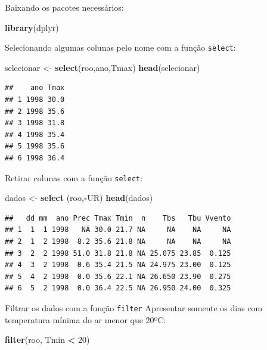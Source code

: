 \documentclass[
]{book}
\newenvironment{Shaded}{\begin{snugshade}}{\end{snugshade}}
\newcommand{\DecValTok}[1]{\textcolor[rgb]{0.00,0.00,0.81}{#1}}
\newcommand{\KeywordTok}[1]{\textcolor[rgb]{0.13,0.29,0.53}{\textbf{#1}}}
\newcommand{\NormalTok}[1]{#1}
\newcommand{\OperatorTok}[1]{\textcolor[rgb]{0.81,0.36,0.00}{\textbf{#1}}}
\newcommand{\StringTok}[1]{\textcolor[rgb]{0.31,0.60,0.02}{#1}}
\begin{document}
Baixando os pacotes necessários:

\begin{Shaded}
\begin{Highlighting}[]
\KeywordTok{library}\NormalTok{(dplyr)}
\end{Highlighting}
\end{Shaded}

Selecionando algumas colunas pelo nome com a função \texttt{select}:

\begin{Shaded}
\begin{Highlighting}[]
\NormalTok{selecionar <-}\StringTok{ }\KeywordTok{select}\NormalTok{(roo,ano,Tmax)}
\KeywordTok{head}\NormalTok{(selecionar)}
\end{Highlighting}
\end{Shaded}

\begin{verbatim}
##    ano Tmax
## 1 1998 30.0
## 2 1998 35.6
## 3 1998 31.8
## 4 1998 35.4
## 5 1998 35.6
## 6 1998 36.4
\end{verbatim}

Retirar colunas com a função \texttt{select}:

\begin{Shaded}
\begin{Highlighting}[]
\NormalTok{dados <-}\StringTok{ }\KeywordTok{select}\NormalTok{ (roo,}\OperatorTok{-}\NormalTok{UR)}
\KeywordTok{head}\NormalTok{(dados)}
\end{Highlighting}
\end{Shaded}

\begin{verbatim}
##   dd mm  ano Prec Tmax Tmin  n    Tbs   Tbu Vvento
## 1  1  1 1998   NA 30.0 21.7 NA     NA    NA     NA
## 2  1  2 1998  8.2 35.6 21.8 NA     NA    NA     NA
## 3  2  2 1998 51.0 31.8 21.8 NA 25.075 23.85  0.125
## 4  3  2 1998  0.6 35.4 21.5 NA 24.975 23.00  0.125
## 5  4  2 1998  0.0 35.6 22.1 NA 26.650 23.90  0.275
## 6  5  2 1998  0.0 36.4 22.5 NA 26.950 24.00  0.325
\end{verbatim}

Filtrar os dados com a função \texttt{filter}
Apresentar somente os dias com temperatura mínima do ar menor que 20ºC:

\begin{Shaded}
\begin{Highlighting}[]
\KeywordTok{filter}\NormalTok{(roo, Tmin }\OperatorTok{<}\StringTok{ }\DecValTok{20}\NormalTok{)}
\end{Highlighting}
\end{Shaded}
\end{document}
